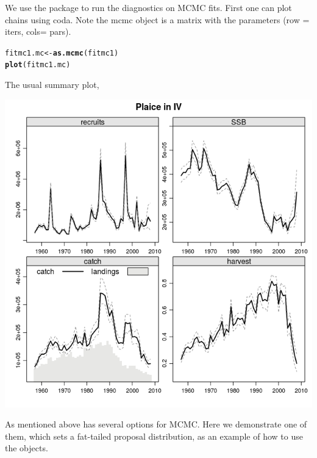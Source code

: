 \documentclass[a4paper,english,10pt]{article}\usepackage[]{graphicx}\usepackage[]{color}
\makeatletter
\def\maxwidth{ %
  \ifdim\Gin@nat@width>\linewidth
    \linewidth
  \else
    \Gin@nat@width
  \fi
}
\newcommand{\hlstd}[1]{\textcolor[rgb]{0.345,0.345,0.345}{#1}}%
\newcommand{\hlkwb}[1]{\textcolor[rgb]{0.69,0.353,0.396}{#1}}%
\newcommand{\hlkwd}[1]{\textcolor[rgb]{0.737,0.353,0.396}{\textbf{#1}}}%
\newenvironment{kframe}{%
 \def\at@end@of@kframe{}%
 \ifinner\ifhmode%
  \def\at@end@of@kframe{\end{minipage}}%
  \begin{minipage}{\columnwidth}%
 \fi\fi%
 \def\FrameCommand##1{\hskip\@totalleftmargin \hskip-\fboxsep
 \colorbox{shadecolor}{##1}\hskip-\fboxsep
     \hskip-\linewidth \hskip-\@totalleftmargin \hskip\columnwidth}%
 \MakeFramed {\advance\hsize-\width
   \@totalleftmargin\z@ \linewidth\hsize
   \@setminipage}}%
 {\par\unskip\endMakeFramed%
 \at@end@of@kframe}
\newenvironment{knitrout}{}{} %
\makeatother
\begin{document}
We use the package  to run the diagnostics on MCMC fits. First one can plot chains using coda. Note the mcmc object is a matrix with the parameters (row = iters, cols= pars).

\begin{knitrout}
\color{fgcolor}\begin{kframe}
\begin{alltt}
\hlstd{fitmc1.mc} \hlkwb{<-} \hlkwd{as.mcmc}\hlstd{(fitmc1)}
\hlkwd{plot}\hlstd{(fitmc1.mc)}
\end{alltt}
\end{kframe}
\end{knitrout}

The usual summary plot,

\begin{knitrout}
\color{fgcolor}

{\centering \includegraphics[width=\maxwidth]{figure/unnamed-chunk-34-1} 

}



\end{knitrout}

As mentioned above  has several options for MCMC. Here we demonstrate one of them,  which sets a fat-tailed proposal distribution, as an example of how to use the  objects. 
\end{document}
